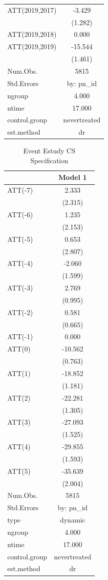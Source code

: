 \documentclass[
  12pt,
]{article}
\begin{document}
\begin{table}
\begin{tabular}[t]{lc}
ATT(2019,2017) & -3.429\\
 & (1.282)\\
ATT(2019,2018) & 0.000\\
ATT(2019,2019) & -15.544\\
 & (1.461)\\
\midrule
Num.Obs. & 5815\\
Std.Errors & by: pn\_id\\
ngroup & 4.000\\
ntime & 17.000\\
control.group & nevertreated\\
est.method & dr\\
\bottomrule
\end{tabular}
\end{table}

\begin{table}

\caption{\label{tab:Tab-7}Event Estudy CS Specification}
\centering
\begin{tabular}[t]{lc}
\toprule
  & Model 1\\
\midrule
ATT(-7) & 2.333\\
 & (2.315)\\
ATT(-6) & 1.235\\
 & (2.153)\\
ATT(-5) & 0.653\\
 & (2.807)\\
ATT(-4) & -2.060\\
 & (1.599)\\
ATT(-3) & 2.769\\
 & (0.995)\\
ATT(-2) & 0.581\\
 & (0.665)\\
ATT(-1) & 0.000\\
ATT(0) & -10.562\\
 & (0.763)\\
ATT(1) & -18.852\\
 & (1.181)\\
ATT(2) & -22.281\\
 & (1.305)\\
ATT(3) & -27.093\\
 & (1.525)\\
ATT(4) & -29.855\\
 & (1.593)\\
ATT(5) & -35.639\\
 & (2.004)\\
\midrule
Num.Obs. & 5815\\
Std.Errors & by: pn\_id\\
type & dynamic\\
ngroup & 4.000\\
ntime & 17.000\\
control.group & nevertreated\\
est.method & dr\\
\bottomrule
\end{tabular}
\end{table}
\end{document}
